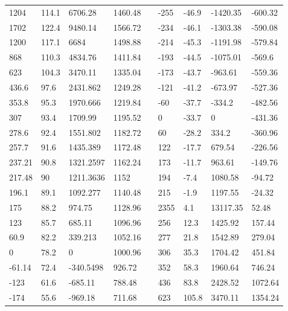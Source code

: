 \documentclass[a4paper,12pt]{article}
\begin{document}
\begin{enumerate}
\begin{table}[h!]
\begin{tabular}{|l|l|l|l||l||l|l|l|l|}
1204   & 114.1          & 6706.28   & 1460.48        &  & -255  & -46.9 & -1420.35 & -600.32 \\
1702   & 122.4          & 9480.14   & 1566.72        &  & -234  & -46.1 & -1303.38 & -590.08 \\
1200   & 117.1          & 6684      & 1498.88        &  & -214  & -45.3 & -1191.98 & -579.84 \\
868    & 110.3          & 4834.76   & 1411.84        &  & -193  & -44.5 & -1075.01 & -569.6  \\
623    & 104.3          & 3470.11   & 1335.04        &  & -173  & -43.7 & -963.61  & -559.36 \\
436.6  & 97.6           & 2431.862  & 1249.28        &  & -121  & -41.2 & -673.97  & -527.36 \\
353.8  & 95.3           & 1970.666  & 1219.84        &  & -60   & -37.7 & -334.2   & -482.56 \\
307    & 93.4           & 1709.99   & 1195.52        &  & 0     & -33.7 & 0        & -431.36 \\
278.6  & 92.4           & 1551.802  & 1182.72        &  & 60    & -28.2 & 334.2    & -360.96 \\
257.7  & 91.6           & 1435.389  & 1172.48        &  & 122   & -17.7 & 679.54   & -226.56 \\
237.21 & 90.8           & 1321.2597 & 1162.24        &  & 173   & -11.7 & 963.61   & -149.76 \\
217.48 & 90             & 1211.3636 & 1152           &  & 194   & -7.4  & 1080.58  & -94.72  \\
196.1  & 89.1           & 1092.277  & 1140.48        &  & 215   & -1.9  & 1197.55  & -24.32  \\
175    & 88.2           & 974.75    & 1128.96        &  & 2355  & 4.1   & 13117.35 & 52.48   \\
123    & 85.7           & 685.11    & 1096.96        &  & 256   & 12.3  & 1425.92  & 157.44  \\
60.9   & 82.2           & 339.213   & 1052.16        &  & 277   & 21.8  & 1542.89  & 279.04  \\
0      & 78.2           & 0         & 1000.96        &  & 306   & 35.3  & 1704.42  & 451.84  \\
-61.14 & 72.4           & -340.5498 & 926.72         &  & 352   & 58.3  & 1960.64  & 746.24  \\
-123   & 61.6           & -685.11   & 788.48         &  & 436   & 83.8  & 2428.52  & 1072.64 \\
-174   & 55.6           & -969.18   & 711.68         &  & 623   & 105.8 & 3470.11  & 1354.24 \\

\end{tabular}
\end{table}
\end{enumerate}
\end{document}
